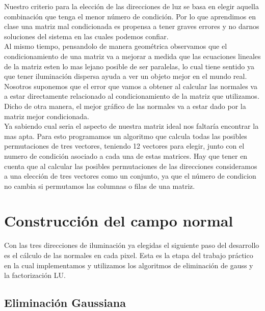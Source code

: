 Nuestro criterio para la elección de las direcciones de luz se basa en elegir aquella combinación que tenga el menor número de condición. Por lo que aprendimos en clase una matriz mal condicionada es propensa a tener graves errores y no darnos soluciones del sistema en las cuales podemos confiar.\\
Al mismo tiempo, pensandolo de manera geométrica observamos que el condicionamiento de una matriz va a mejorar a medida que las ecuaciones lineales de la matriz esten lo mas lejano posible de ser paralelas, lo cual tiene sentido ya que tener iluminación dispersa ayuda a ver un objeto mejor en el mundo real. Nosotros suponemos que el error que vamos a obtener al calcular las normales va a estar directamente relacionado al condicionamiento de la matriz que utilizamos. Dicho de otra manera, el mejor gráfico de las normales va a estar dado por la matriz mejor condicionada.\\

Ya sabiendo cual seria el aspecto de nuestra matriz ideal nos faltaría encontrar la mas apta. Para esto  programamos un algoritmo que calcula todas las posibles permutaciones de tres vectores, teniendo 12 vectores para elegir, junto con el numero de condición asociado a cada una de estas matrices. Hay que tener en cuenta que al calcular las posibles permutaciones de las direcciones consideramos a una elección de tres vectores como un conjunto, ya que el número de condicion no cambia si permutamos las columnas o filas de una matriz.


\section{Construcción del campo normal}	


\indent Con las tres direcciones de iluminación ya elegidas el siguiente paso del desarrollo es el cálculo de las normales en cada pixel. Esta es la etapa del trabajo práctico en la cual implementamos y utilizamos los algoritmos de eliminación de gauss y la factorización LU.\par

\subsection{Eliminación Gaussiana}

